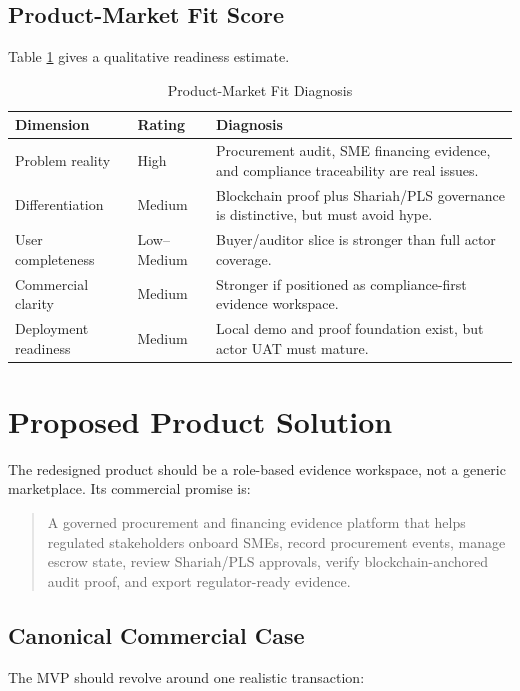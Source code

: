 \documentclass[conference]{IEEEtran}
\begin{document}
\subsection{Product-Market Fit Score}
Table \ref{tab:pmf} gives a qualitative readiness estimate.

\begin{table}[htbp]
\caption{Product-Market Fit Diagnosis}
\label{tab:pmf}
\centering
\small
\begin{tabularx}{\columnwidth}{p{}p{}X}
\toprule
Dimension & Rating & Diagnosis \\
\midrule
Problem reality & High & Procurement audit, SME financing evidence, and compliance traceability are real issues. \\
Differentiation & Medium & Blockchain proof plus Shariah/PLS governance is distinctive, but must avoid hype. \\
User completeness & Low--Medium & Buyer/auditor slice is stronger than full actor coverage. \\
Commercial clarity & Medium & Stronger if positioned as compliance-first evidence workspace. \\
Deployment readiness & Medium & Local demo and proof foundation exist, but actor UAT must mature. \\
\bottomrule
\end{tabularx}
\end{table}

\section{Proposed Product Solution}

The redesigned product should be a role-based evidence workspace, not a generic marketplace. Its commercial promise is:

\begin{quote}
A governed procurement and financing evidence platform that helps regulated stakeholders onboard SMEs, record procurement events, manage escrow state, review Shariah/PLS approvals, verify blockchain-anchored audit proof, and export regulator-ready evidence.
\end{quote}

\subsection{Canonical Commercial Case}
The MVP should revolve around one realistic transaction:
\end{document}
